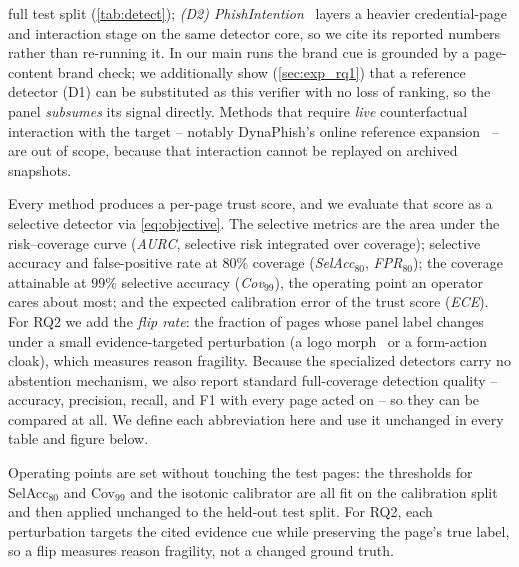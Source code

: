 full test split (\autoref{tab:detect}); \emph{(D2) PhishIntention}~\cite{liu2022phishintention} layers a
heavier credential-page and interaction stage on the same detector core, so we cite its
reported numbers rather than re-running it. In our main runs the brand cue
is grounded by a page-content brand check; we additionally show (\autoref{sec:exp_rq1}) that
a reference detector (D1) can be substituted as this verifier with no loss of ranking, so
the panel \emph{subsumes} its signal directly. Methods that require
\emph{live} counterfactual interaction with the target -- notably DynaPhish's online
reference expansion~\cite{dynaphish2023} -- are out of scope, because that interaction
cannot be replayed on archived snapshots.


Every method produces a per-page trust score, and we evaluate that score as a
selective detector via \eqref{eq:objective}. The selective metrics are the area
under the risk--coverage curve (\emph{AURC}, selective risk integrated over
coverage); selective accuracy and false-positive rate at $80\%$ coverage
(\emph{SelAcc$_{80}$}, \emph{FPR$_{80}$}); the coverage attainable at $99\%$
selective accuracy (\emph{Cov$_{99}$}), the operating point an operator cares about
most; and the expected calibration error of the trust score (\emph{ECE}). For RQ2 we
add the \emph{flip rate}: the fraction of pages whose panel label changes under a
small evidence-targeted perturbation (a logo morph~\cite{hao2024logomorph} or a
form-action cloak), which measures reason fragility. Because the specialized
detectors carry no abstention mechanism, we also report standard full-coverage
detection quality -- accuracy, precision, recall, and F1 with every page acted on --
so they can be compared at all. We define each abbreviation here and use it
unchanged in every table and figure below.

Operating points are set without touching the test pages: the thresholds for
SelAcc$_{80}$ and Cov$_{99}$ and the isotonic calibrator are all fit on the
calibration split and then applied unchanged to the held-out test split. For RQ2,
each perturbation targets the cited evidence cue while preserving the page's true
label, so a flip measures reason fragility, not a changed ground truth.

